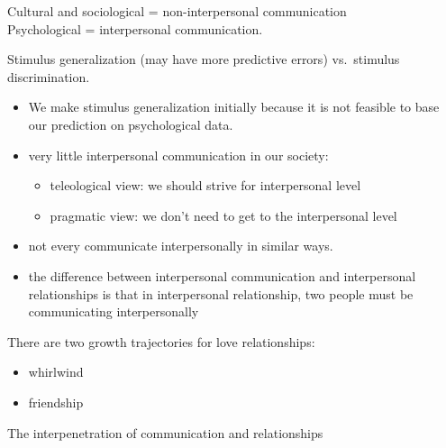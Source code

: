 \documentclass[
]{book}
\providecommand{\tightlist}{%
  \setlength{\itemsep}{0pt}\setlength{\parskip}{0pt}}
\begin{document}
Cultural and sociological = non-interpersonal communication\\
Psychological = interpersonal communication.

Stimulus generalization (may have more predictive errors) vs.~stimulus discrimination.

\begin{itemize}
\item
  We make stimulus generalization initially because it is not feasible to base our prediction on psychological data.
\item
  very little interpersonal communication in our society:

  \begin{itemize}
  \tightlist
  \item
    teleological view: we should strive for interpersonal level
  \item
    pragmatic view: we don't need to get to the interpersonal level
  \end{itemize}
\item
  not every communicate interpersonally in similar ways.
\item
  the difference between interpersonal communication and interpersonal relationships is that in interpersonal relationship, two people must be communicating interpersonally
\end{itemize}

\citep{wilmot1995}

There are two growth trajectories for love relationships:

\begin{itemize}
\tightlist
\item
  whirlwind
\item
  friendship
\end{itemize}

The interpenetration of communication and relationships
\end{document}
